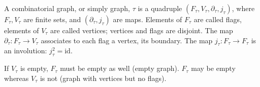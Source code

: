 A combinatorial graph, or simply graph, $\tau$ is a quadruple $(F_{\tau}, V_{\tau}, \partial_{\tau}, j_{\tau})$, where $F_{\tau}, V_{\tau}$ are finite sets, and $(\partial_{\tau}, j_{\tau})$ are maps. Elements of $F_{\tau}$ are called flags, elements of $V_{\tau}$ are called vertices; vertices and flags are disjoint. The map $\partial_{\tau} : F_{\tau} \rightarrow V_{\tau}$ associates to each flag a vertex, its boundary. The map $j_{\tau} : F_{\tau} \rightarrow F_{\tau}$ is an involution: $j_{\tau}^2 = \text{id}$.

If $V_{\tau}$ is empty, $F_{\tau}$ must be empty as well (empty graph). $F_{\tau}$ may be empty whereas $V_{\tau}$ is not (graph with vertices but no flags).
